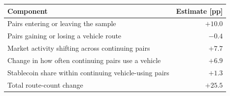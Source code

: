 \begin{tabularx}{\linewidth}{@{}>{\raggedright\arraybackslash}Xr@{}}
\toprule
Component & Estimate [pp] \\
\midrule
Pairs entering or leaving the sample & $+10.0$ \\
Pairs gaining or losing a vehicle route & $-0.4$ \\
Market activity shifting across continuing pairs & $+7.7$ \\
Change in how often continuing pairs use a vehicle & $+6.9$ \\
Stablecoin share within continuing vehicle-using pairs & $+1.3$ \\
\midrule
Total route-count change & $+25.5$ \\
\bottomrule
\end{tabularx}
